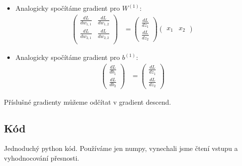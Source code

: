 \begin{itemize}
  \item  Analogicky spočítáme gradient pro $W^{(1)}$:
    \begin{align*}
      \begin{pmatrix}
        \frac{dL}{dw_{1,1}} & \frac{dL}{dw_{1,2}} \\
        \frac{dL}{dw_{2,1}} & \frac{dL}{dw_{2,2}} \\
      \end{pmatrix}
      &=
      \begin{pmatrix}
        \frac{dL}{dz_1} \\
        \frac{dL}{dz_2}
      \end{pmatrix}
      \begin{pmatrix}
        x_1 & x_2
      \end{pmatrix}
    \end{align*}

  \item  Analogicky spočítáme gradient pro $b^{(1)}$:
    \begin{align*}
      \begin{pmatrix}
        \frac{dL}{db_1} \\
        \frac{dL}{db_2}
      \end{pmatrix}
      &=
      \begin{pmatrix}
        \frac{dL}{dz_1} \\
        \frac{dL}{dz_2}
      \end{pmatrix}
    \end{align*}

\end{itemize}

Příslušné gradienty můžeme odčítat v gradient descend.

\subsection{Kód}

Jednoduchý python kód.
Používáme jen numpy, vynechali jsme čtení vstupu a vyhodnocování přesnosti.

\inputminted{python}{bonus/nn_jen_uceni.py}

